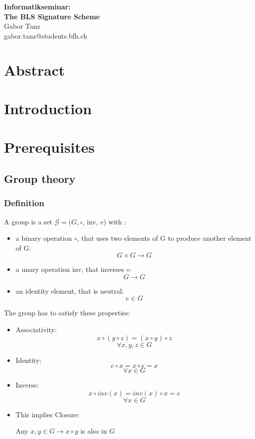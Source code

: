 \documentclass[a4paper,12pt]{scrartcl}
\begin{document}
\begin{titlepage}
\begin{center}
\vspace*{3cm}
\vspace{1cm}
\Huge \textbf{Informatikseminar: \\ The BLS Signature Scheme} \\
\vspace{6cm}
\vspace{1cm}
\large Gabor Tanz \\ gabor.tanz@students.bfh.ch \\
\end{center}
\end{titlepage}

\tableofcontents
\pagebreak

\section{Abstract}
\pagebreak

\section{Introduction}
\pagebreak

\section{Prerequisites}
\subsection{Group theory}
\subsubsection{Definition}
A group is a set \(\mathcal{G} = (G, \circ\), inv, \(e\)) with \cite[Slide 2.16]{crypto-slides-haenni}:
\begin{itemize}
	\item a binary operation \(\circ \), that uses two elements of G to produce another element of G:
	\[ G \times G \rightarrow G \]
	\item a unary operation inv, that inverses \(\circ\):
	\[ G \rightarrow G \]
	\item an identity element, that is neutral:
	\[ e \in G \]
\end{itemize}
The group has to satisfy these properties:
\begin{itemize}
	\item Associativity:
	\[ x \circ (y \circ z) = (x \circ y) \circ z \]
	\[\forall x,y,z \in G \]
	\item Identity:
	\[ e \circ x = x \circ e = x \]
	\[ \forall x \in G \]
	\item Inverse:
	\[ x \circ inv(x) = inv(x) \circ x = e \]
	\[ \forall x \in G \]
	\item This implies Closure:
	\begin{center}
		Any \(x,y \in G \rightarrow x \circ y \) is also in \( G \)
	\end{center}
\end{itemize}
\end{document}
